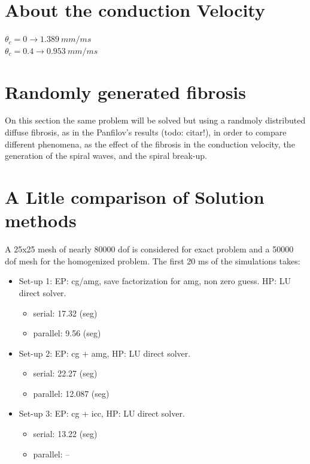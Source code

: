 \newpage
\section{About the conduction Velocity}

$\theta_c = 0   \rightarrow 1.389 ~ mm/ms$ \\
$\theta_c = 0.4 \rightarrow 0.953 ~ mm/ms$

\newpage
\section{Randomly generated fibrosis}

On this section the same problem will be solved but using a randmoly distributed diffuse fibrosis, as in the Panfilov's results (todo: citar!), in order to compare different phenomena, as the effect of the fibrosis in the conduction velocity, the generation of the spiral waves, and the spiral break-up. 

\newpage
\section{A Litle comparison of Solution methods}

A 25x25 mesh of nearly 80000 dof is considered for exact problem and a 50000 dof mesh for the homogenized problem. The first 20 ms of the simulations takes:

\begin{itemize}
\item Set-up 1: EP: cg/amg, save factorization for amg, non zero guess. HP: LU direct solver.
\begin{itemize}
\item serial: 17.32 (seg)
\item parallel: 9.56 (seg)
\end{itemize}
\item Set-up 2: EP: cg + amg, HP: LU direct solver.
\begin{itemize}
\item serial: 22.27 (seg)
\item parallel: 12.087 (seg)
\end{itemize}
\item Set-up 3: EP: cg + icc, HP: LU direct solver.
\begin{itemize}
\item serial: 13.22 (seg)
\item parallel: --
\end{itemize}
\end{itemize}